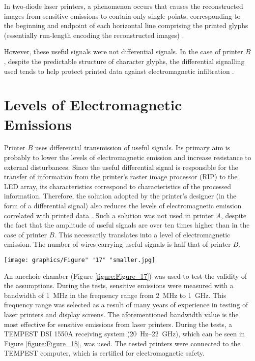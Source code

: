 \documentclass[letterpaper,journal]{ieeetran}
\begin{document}
In two-diode laser printers, a phenomenon occurs that causes the
reconstructed images from sensitive emissions to contain only single points,
corresponding to the beginning and endpoint of each horizontal line
comprising the printed glyphs (essentially run-length encoding
the reconstructed images) \cite{Kubiak2014d}.

However, these useful signals were not differential signals. In the case of
printer $B$, despite the predictable structure of character glyphs, the
differential signalling used tends to help protect printed data against
electromagnetic infiltration \cite{Ketenci2017a}.

\section{Levels of Electromagnetic Emissions}

Printer $B$ uses differential transmission of useful signals. Its primary aim
is probably to lower the levels of electromagnetic emission and increase
resistance to external disturbances. Since the useful differential signal is
responsible for the transfer of information from the printer's raster image
processor (RIP) to the LED array, its characteristics correspond to
characteristics of the processed information. Therefore, the solution adopted
by the printer's designer (in the form of a differential signal) also reduces
the levels of electromagnetic emission correlated with printed data
\cite{Song2015a}. Such a solution was not used in printer $A$, despite the
fact that the amplitude of useful signals are over ten times higher than in
the case of printer $B$. This necessarily translates into a level of
electromagnetic emission. The number of wires carrying useful signals is half
that of printer $B$.

\begin{figure*}[ht]
    \centering
    \texttt{[image: graphics/Figure" "17" "smaller.jpg]}
    \caption{Anechoic chamber where the tests were carried out.}
    \label{figure:Figure_17}
\end{figure*}

An anechoic chamber (Figure \ref{figure:Figure_17}) was used to test the
validity of the assumptions.
During the tests, sensitive emissions were measured with a bandwidth of
\SI{1}{\mega\hertz} in the frequency range from \SI{2}{\mega\hertz} to
\SI{1}{\giga\hertz}. This frequency range was selected as a result of many
years of experience in testing of laser printers and display screens. The
aforementioned bandwidth value is the most effective for sensitive emissions
from laser printers. During the tests, a TEMPEST DSI 1550A receiving system
(\SI{20}{\hertz}--\SI{22}{\giga\hertz}), which can be seen in Figure
\ref{figure:Figure_18}, was used. The tested printers were connected to the
TEMPEST computer, which is certified for electromagnetic safety.
\end{document}
